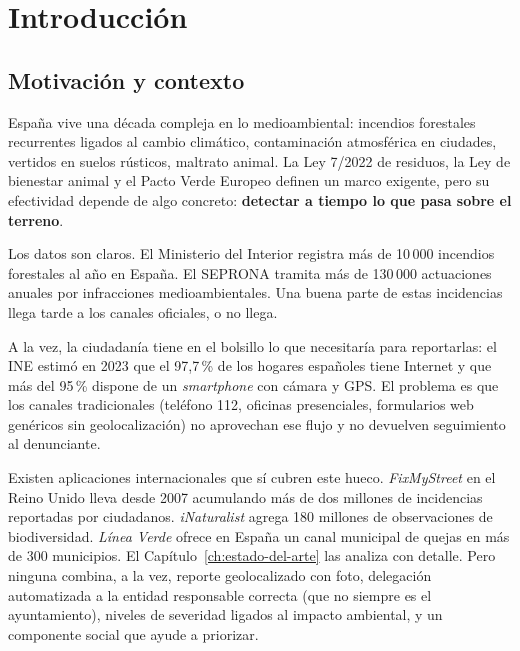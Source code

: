 \chapter{Introducción}
\label{ch:introduccion}

\section{Motivación y contexto}
\label{sec:motivacion}

España vive una década compleja en lo medioambiental: incendios forestales recurrentes ligados al cambio climático, contaminación atmosférica en ciudades, vertidos en suelos rústicos, maltrato animal. La Ley 7/2022 de residuos, la Ley de bienestar animal y el Pacto Verde Europeo definen un marco exigente, pero su efectividad depende de algo concreto: \textbf{detectar a tiempo lo que pasa sobre el terreno}.

Los datos son claros. El Ministerio del Interior registra más de 10\,000 incendios forestales al año en España. El SEPRONA tramita más de 130\,000 actuaciones anuales por infracciones medioambientales. Una buena parte de estas incidencias llega tarde a los canales oficiales, o no llega.

A la vez, la ciudadanía tiene en el bolsillo lo que necesitaría para reportarlas: el INE estimó en 2023 que el 97{,}7\,\% de los hogares españoles tiene Internet y que más del 95\,\% dispone de un \textit{smartphone} con cámara y GPS. El problema es que los canales tradicionales (teléfono 112, oficinas presenciales, formularios web genéricos sin geolocalización) no aprovechan ese flujo y no devuelven seguimiento al denunciante.

Existen aplicaciones internacionales que sí cubren este hueco. \textit{FixMyStreet} en el Reino Unido lleva desde 2007 acumulando más de dos millones de incidencias reportadas por ciudadanos. \textit{iNaturalist} agrega 180 millones de observaciones de biodiversidad. \textit{Línea Verde} ofrece en España un canal municipal de quejas en más de 300 municipios. El Capítulo~\ref{ch:estado-del-arte} las analiza con detalle. Pero ninguna combina, a la vez, reporte geolocalizado con foto, delegación automatizada a la entidad responsable correcta (que no siempre es el ayuntamiento), niveles de severidad ligados al impacto ambiental, y un componente social que ayude a priorizar.

